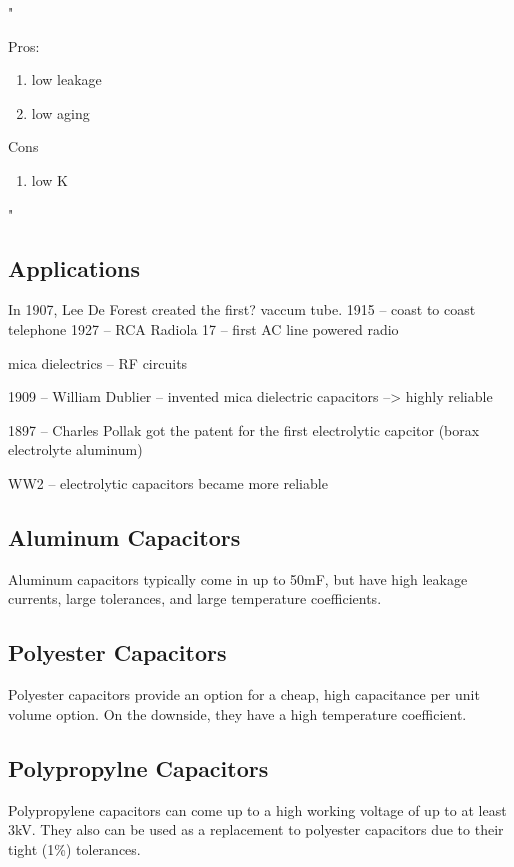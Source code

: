 "

Pros:
\begin{enumerate}
    \item low leakage
    \item low aging
\end{enumerate}

Cons
\begin{enumerate}
    \item low K
\end{enumerate}

"
\cite{capSite_intro}

\subsection{Applications}

In 1907, Lee De Forest created the first? vaccum tube. \cite{deis_hist}
1915 -- coast to coast telephone
1927 -- RCA Radiola 17 -- first AC line powered radio

mica dielectrics -- RF circuits

1909 -- William Dublier -- invented mica dielectric capacitors
--> highly reliable

1897 -- Charles Pollak got the patent for the first electrolytic capcitor (borax electrolyte aluminum)

WW2 -- electrolytic capacitors became more reliable

\subsection{Aluminum Capacitors}

Aluminum capacitors typically come in up to 50mF, but have high leakage currents, large tolerances, and large temperature coefficients. \cite{learn_caps}

\subsection{Polyester Capacitors}

Polyester capacitors provide an option for a cheap, high capacitance per unit volume option. On the downside, they have a high temperature coefficient. \cite{learn_caps}

\subsection{Polypropylne Capacitors}

Polypropylene capacitors can come up to a high working voltage of up to at least 3kV. They also can be used as a replacement to polyester capacitors due to their tight (1\%) tolerances.\cite{learn_caps}

